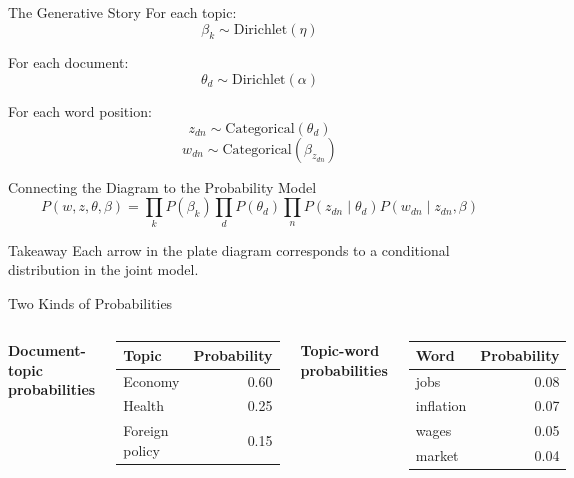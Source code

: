 \documentclass[aspectratio=169]{beamer}
\begin{document}
\begin{frame}{The Generative Story}
For each topic:
\[
\beta_k \sim \text{Dirichlet}(\eta)
\]

For each document:
\[
\theta_d \sim \text{Dirichlet}(\alpha)
\]

For each word position:
\[
z_{dn} \sim \text{Categorical}(\theta_d)
\]
\[
w_{dn} \sim \text{Categorical}(\beta_{z_{dn}})
\]
\end{frame}

\begin{frame}{Connecting the Diagram to the Probability Model}
\[
P(w,z,\theta,\beta)
=
\prod_k P(\beta_k)
\prod_d P(\theta_d)
\prod_n
P(z_{dn}\mid \theta_d)
P(w_{dn}\mid z_{dn},\beta)
\]

\vspace{0.4cm}
\begin{block}{Takeaway}
Each arrow in the plate diagram corresponds to a conditional distribution in the joint model.
\end{block}
\end{frame}

\begin{frame}{Two Kinds of Probabilities}
\begin{columns}
\textbf{Document-topic probabilities}

\begin{center}
\begin{tabular}{lr}
\toprule
Topic & Probability \\
\midrule
Economy & 0.60 \\
Health & 0.25 \\
Foreign policy & 0.15 \\
\bottomrule
\end{tabular}
\end{center}

\textbf{Topic-word probabilities}

\begin{center}
\begin{tabular}{lr}
\toprule
Word & Probability \\
\midrule
jobs & 0.08 \\
inflation & 0.07 \\
wages & 0.05 \\
market & 0.04 \\
\bottomrule
\end{tabular}
\end{center}
\end{columns}
\end{frame}
\end{document}
